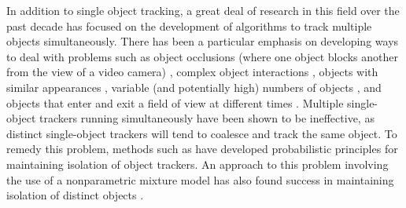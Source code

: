\documentclass[smallcondensed, final]{svjour3}
\begin{document}
In addition to single object tracking, a great deal of research in this field over the past decade has focused on the development of algorithms to track multiple objects simultaneously. There has been a particular emphasis on developing ways to deal with problems such as object occlusions (where one object blocks another from the view of a video camera) \cite{senior2006appearance, cucchiara2004probabilistic, zhou2003background}, complex object interactions \cite{khan_2004, mckenna2000tracking, dockstader2001multiple}, objects with similar appearances \cite{maccormick1999probabilistic, jepson_2003}, variable (and potentially high) numbers of objects \cite{reilly2010detection}, and objects that enter and exit a field of view at different times \cite{stauffer2003estimating, nedrich2010learning}. Multiple single-object trackers running simultaneously have been shown to be ineffective, as distinct single-object trackers will tend to coalesce and track the same object. To remedy this problem, methods such as \cite{maccormick1999probabilistic} have developed probabilistic principles for maintaining isolation of object trackers. An approach to this problem involving the use of a nonparametric mixture model has also found success in maintaining isolation of distinct objects \cite{vermaak_2003}.
\end{document}
